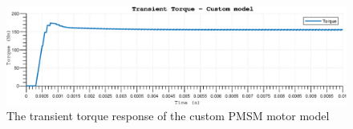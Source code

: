 \begin{figure}[htb]
\begingroup
\tikzset{}
 \centerline{\includegraphics[width=1\columnwidth]{.//Figure/EPS/custom_torque.eps}}
 \endgroup
 \caption{The transient torque response of the custom PMSM motor model}
 \label{fig:cutom_torque_trans}
\end{figure}